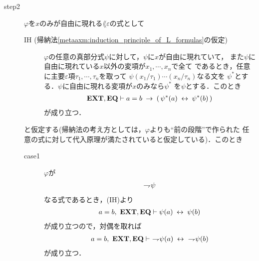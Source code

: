 \begin{sketch}
\begin{description}
			\item[step2]
				$\varphi$を$x$のみが自由に現れる$\lang{\varepsilon}$の式として
				\begin{description}
					\item[IH (帰納法\ref{metaaxm:induction_principle_of_L_formulas}の仮定)]
						$\varphi$の任意の真部分式$\psi$に対して，$\psi$に$x$が自由に現れていて，
						また$\psi$に自由に現れている$x$以外の変項が$x_{1},\cdots,x_{n}$で全て
						であるとき，任意に主要$\varepsilon$項$\tau_{1},\cdots,\tau_{n}$を取って
						$\psi(x_{1}/\tau_{1})\cdots(x_{n}/\tau_{n})$なる文を
						$\psi^{*}$とする．$\psi$に自由に現れる変項が$x$のみなら$\psi^{*}$
						を$\psi$とする．このとき
						\begin{align}
							\mbox{{\bf EXT}},\mbox{{\bf EQ}} \vdash a = b \hspace{0.25em}\rightarrow\hspace{0.25em} 
							(\, \psi^{*}(a) \hspace{0.25em}\leftrightarrow\hspace{0.25em} \psi^{*}(b)\, )
						\end{align}
						が成り立つ．
				\end{description}
				と仮定する(帰納法の考え方としては，$\varphi$よりも``前の段階''で作られた
				任意の式に対して代入原理が満たされていると仮定している)．このとき
				\begin{description}
					\item[case1] $\varphi$が
						\begin{align}
							\rightharpoondown\hspace{-0.25em} \psi
						\end{align}
						なる式であるとき，(IH)より
						\begin{align}
							a = b,\ \mbox{{\bf EXT}},\mbox{{\bf EQ}} \vdash \psi(a) \hspace{0.25em}\leftrightarrow\hspace{0.25em} \psi(b)
						\end{align}
						が成り立つので，対偶を取れば
						\begin{align}
							a = b,\ \EXTAX,\EQAX \vdash\ 
							\negation \psi(a) \lrarrow\ \negation \psi(b)
						\end{align}
						が成り立つ．
						

\end{description}
\end{description}
\end{sketch}
